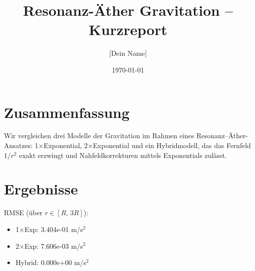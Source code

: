 \documentclass[a4paper,11pt]{article}
\title{Resonanz-Äther Gravitation -- Kurzreport}
\author{[Dein Name]}
\date{\today}
\begin{document}
\maketitle
\section*{Zusammenfassung}
Wir vergleichen drei Modelle der Gravitation im Rahmen eines Resonanz--Äther-Ansatzes: 1×Exponential, 2×Exponential und ein Hybridmodell, das das Fernfeld $1/r^2$ exakt erzwingt und Nahfeldkorrekturen mittels Exponentials zulässt.

\section*{Ergebnisse}
RMSE (über $r\in[R,\,3R]$):
\begin{itemize}
\item 1×Exp: 3.404e-01 m/s$^2$
\item 2×Exp: 7.606e-03 m/s$^2$
\item Hybrid: 0.000e+00 m/s$^2$
\end{itemize}
\end{document}
